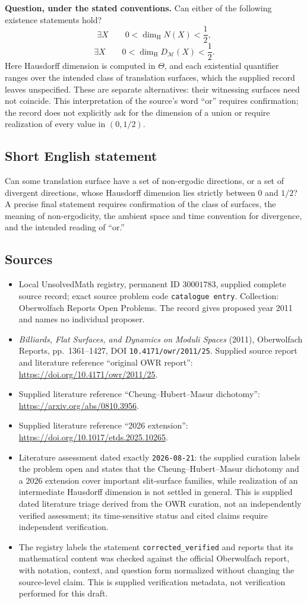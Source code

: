 \documentclass[11pt]{article}
\begin{document}
\textbf{Question, under the stated conventions.} Can either of the following existence statements hold?
\[
\exists X\qquad 0<\dim_{\mathrm H}N(X)<\frac12,
\]
\[
\exists X\qquad 0<\dim_{\mathrm H}D_{\mathcal M}(X)<\frac12.
\]
Here Hausdorff dimension is computed in \(\Theta\), and each existential quantifier ranges over the intended class of translation surfaces, which the supplied record leaves unspecified. These are separate alternatives: their witnessing surfaces need not coincide. This interpretation of the source's word ``or'' requires confirmation; the record does not explicitly ask for the dimension of a union or require realization of every value in \((0,1/2)\).
\subsection{Short English statement}
Can some translation surface have a set of non-ergodic directions, or a set of divergent directions, whose Hausdorff dimension lies strictly between \(0\) and \(1/2\)? A precise final statement requires confirmation of the class of surfaces, the meaning of non-ergodicity, the ambient space and time convention for divergence, and the intended reading of ``or.''
\subsection{Sources}
\begin{itemize}
\item Local UnsolvedMath registry, permanent ID \(30001783\), supplied complete source record; exact source problem code \texttt{catalogue entry}. Collection: Oberwolfach Reports Open Problems. The record gives proposed year 2011 and names no individual proposer.
\item \emph{Billiards, Flat Surfaces, and Dynamics on Moduli Spaces} (2011), Oberwolfach Reports, pp.~1361--1427, DOI \texttt{10.4171/owr/2011/25}. Supplied source report and literature reference ``original OWR report'': \url{https://doi.org/10.4171/owr/2011/25}.
\item Supplied literature reference ``Cheung--Hubert--Masur dichotomy'': \url{https://arxiv.org/abs/0810.3956}.
\item Supplied literature reference ``2026 extension'': \url{https://doi.org/10.1017/etds.2025.10265}.
\item Literature assessment dated exactly \texttt{2026-08-21}: the supplied curation labels the problem open and states that the Cheung--Hubert--Masur dichotomy and a 2026 extension cover important slit-surface families, while realization of an intermediate Hausdorff dimension is not settled in general. This is supplied dated literature triage derived from the OWR curation, not an independently verified assessment; its time-sensitive status and cited claims require independent verification.
\item The registry labels the statement \texttt{corrected\_verified} and reports that its mathematical content was checked against the official Oberwolfach report, with notation, context, and question form normalized without changing the source-level claim. This is supplied verification metadata, not verification performed for this draft.
\end{itemize}
\end{document}
